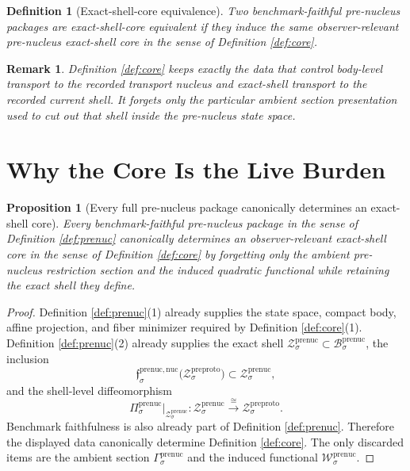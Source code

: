 \documentclass[11pt]{article}
\newcommand{\PreProtoShellSet}[1]{\mathcal Z_{#1}^{\mathrm{preproto}}}
\newcommand{\PreNucBody}[1]{\mathcal B_{#1}^{\mathrm{prenuc}}}
\newcommand{\PreNucProj}[1]{\Pi_{#1}^{\mathrm{prenuc}}}
\newcommand{\PreNucNucleusMin}[1]{\mathfrak f_{#1}^{\mathrm{prenuc,nuc}}}
\newcommand{\PreNucSection}[1]{\Gamma_{#1}^{\mathrm{prenuc}}}
\newcommand{\PreNucFunctional}[1]{\mathscr W_{#1}^{\mathrm{prenuc}}}
\newcommand{\PreNucShellSet}[1]{\mathcal Z_{#1}^{\mathrm{prenuc}}}
\newtheorem{definition}{Definition}
\newtheorem{proposition}{Proposition}
\newtheorem{remark}{Remark}
\begin{document}
\begin{definition}[Exact-shell-core equivalence]
\label{def:eq}
Two benchmark-faithful pre-nucleus packages are \emph{exact-shell-core equivalent} if they induce the same observer-relevant pre-nucleus exact-shell core in the sense of Definition \ref{def:core}.
\end{definition}

\begin{remark}
Definition \ref{def:core} keeps exactly the data that control body-level transport to the recorded transport nucleus and exact-shell transport to the recorded current shell. It forgets only the particular ambient section presentation used to cut out that shell inside the pre-nucleus state space.
\end{remark}

\section{Why the Core Is the Live Burden}

\begin{proposition}[Every full pre-nucleus package canonically determines an exact-shell core]
\label{prop:extract}
Every benchmark-faithful pre-nucleus package in the sense of Definition \ref{def:prenuc} canonically determines an observer-relevant exact-shell core in the sense of Definition \ref{def:core} by forgetting only the ambient pre-nucleus restriction section and the induced quadratic functional while retaining the exact shell they define.
\end{proposition}

\begin{proof}
Definition \ref{def:prenuc}(1) already supplies the state space, compact body, affine projection, and fiber minimizer required by Definition \ref{def:core}(1). Definition \ref{def:prenuc}(2) already supplies the exact shell \(\PreNucShellSet{\sigma}\subset\PreNucBody{\sigma}\), the inclusion
\[
\PreNucNucleusMin{\sigma}\bigl(\PreProtoShellSet{\sigma}\bigr)
\subset
\PreNucShellSet{\sigma},
\]
and the shell-level diffeomorphism
\[
\PreNucProj{\sigma}\big|_{\PreNucShellSet{\sigma}}
:
\PreNucShellSet{\sigma}
\xrightarrow{\cong}
\PreProtoShellSet{\sigma}.
\]
Benchmark faithfulness is also already part of Definition \ref{def:prenuc}. Therefore the displayed data canonically determine Definition \ref{def:core}. The only discarded items are the ambient section \(\PreNucSection{\sigma}\) and the induced functional \(\PreNucFunctional{\sigma}\).
\end{proof}
\end{document}
